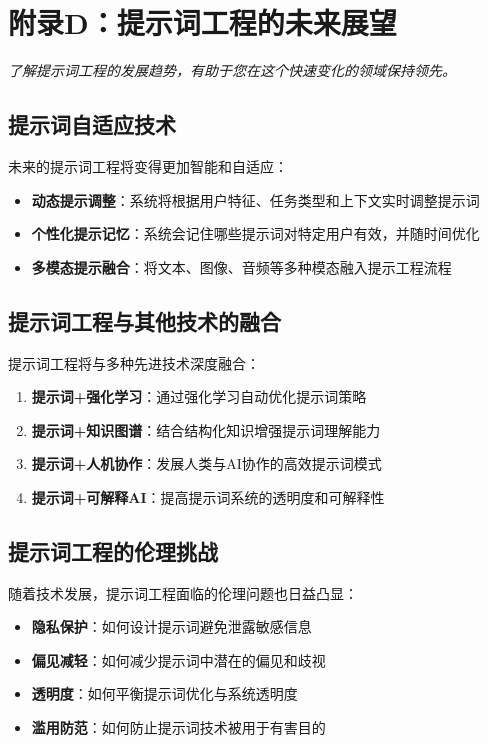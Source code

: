 \documentclass[12pt]{ctexart}
\newcommand{\chapternote}[1]{\vspace{-0.3cm}\par\noindent\textit{\small #1}\vspace{0.3cm}}
\begin{document}
\section{附录D：提示词工程的未来展望}
\chapternote{了解提示词工程的发展趋势，有助于您在这个快速变化的领域保持领先。}

\subsection{提示词自适应技术}
未来的提示词工程将变得更加智能和自适应：

\begin{itemize}
  \item \textbf{动态提示调整}：系统将根据用户特征、任务类型和上下文实时调整提示词
  \item \textbf{个性化提示记忆}：系统会记住哪些提示词对特定用户有效，并随时间优化
  \item \textbf{多模态提示融合}：将文本、图像、音频等多种模态融入提示工程流程
\end{itemize}

\subsection{提示词工程与其他技术的融合}
提示词工程将与多种先进技术深度融合：

\begin{enumerate}
  \item \textbf{提示词+强化学习}：通过强化学习自动优化提示词策略
  \item \textbf{提示词+知识图谱}：结合结构化知识增强提示词理解能力
  \item \textbf{提示词+人机协作}：发展人类与AI协作的高效提示词模式
  \item \textbf{提示词+可解释AI}：提高提示词系统的透明度和可解释性
\end{enumerate}

\subsection{提示词工程的伦理挑战}
随着技术发展，提示词工程面临的伦理问题也日益凸显：

\begin{itemize}
  \item \textbf{隐私保护}：如何设计提示词避免泄露敏感信息
  \item \textbf{偏见减轻}：如何减少提示词中潜在的偏见和歧视
  \item \textbf{透明度}：如何平衡提示词优化与系统透明度
  \item \textbf{滥用防范}：如何防止提示词技术被用于有害目的
\end{itemize}
\end{document}
